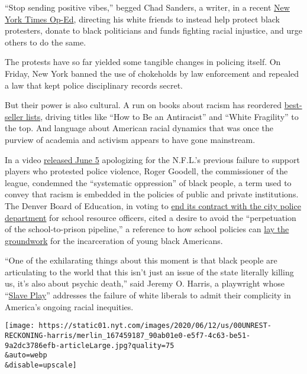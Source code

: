 ``Stop sending positive vibes,'' begged Chad Sanders, a writer, in a
recent
\href{https://www.nytimes.com/2020/06/05/opinion/whites-anti-blackness-protests.html}{New
York Times Op-Ed}, directing his white friends to instead help protect
black protesters, donate to black politicians and funds fighting racial
injustice, and urge others to do the same.

The protests have so far yielded some tangible changes in policing
itself. On Friday, New York banned the use of chokeholds by law
enforcement and repealed a law that kept police disciplinary records
secret.

But their power is also cultural. A run on books about racism has
reordered
\href{https://www.nytimes.com/2020/06/05/books/antiracism-books-race-racism.html}{best-seller
lists}, driving titles like ``How to Be an Antiracist'' and ``White
Fragility'' to the top. And language about American racial dynamics that
was once the purview of academia and activism appears to have gone
mainstream.

In a video
\href{https://twitter.com/NFL/status/1269034074552721408}{released June
5} apologizing for the N.F.L.'s previous failure to support players who
protested police violence, Roger Goodell, the commissioner of the
league, condemned the ``systematic oppression'' of black people, a term
used to convey that racism is embedded in the policies of public and
private institutions. The Denver Board of Education, in voting to
\href{https://www.nytimes.com/2020/06/12/us/schools-police-resource-officers.html}{end
its contract with the city police department} for school resource
officers, cited a desire to avoid the ``perpetuation of the
school-to-prison pipeline,'' a reference to how school policies can
\href{https://www.nytimes.com/2020/04/04/us/politics/black-girls-school-racism.html}{lay
the groundwork} for the incarceration of young black Americans.

``One of the exhilarating things about this moment is that black people
are articulating to the world that this isn't just an issue of the state
literally killing us, it's also about psychic death,'' said Jeremy O.
Harris, a playwright whose
``\href{https://www.nytimes.com/2020/01/27/theater/slave-play-broadway-interviews.html}{Slave
Play}'' addresses the failure of white liberals to admit their
complicity in America's ongoing racial inequities.

\texttt{[image: https://static01.nyt.com/images/2020/06/12/us/00UNREST-RECKONING-harris/merlin\_167459187\_90ab01e0-e5f7-4c63-be51-9a2dc3786efb-articleLarge.jpg?quality=75\\\&auto=webp\\\&disable=upscale]}

